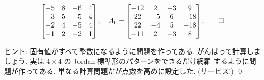 \documentclass[12pt,twoside]{jarticle}
\begin{document}
\begin{question}[各 $A_i$ ごとに10点]
{\begin{align*}
\begin{bmatrix}
      -5 &  8 & -6 &  4 \\
      -3 &  5 & -5 &  4 \\
      -2 &  4 & -5 &  4 \\
      -1 &  2 & -2 &  1 \\
    \end{bmatrix},
    \quad
    A_6 =
    \begin{bmatrix}
      -12 &   2 &  -3 &   9 \\
       22 &  -5 &   6 & -18 \\
       22 &  -4 &   5 & -18 \\
      -11 &   2 &  -3 &   8 \\
    \end{bmatrix}.
    \qed
  \end{align*}
  }%
\end{question}

\noindent
ヒント: 固有値がすべて整数になるように問題を作ってある. 
がんばって計算しましょう. 
実は $4\times 4$ の Jordan 標準形のパターンをできるだけ網羅
するように問題が作ってある.
単なる計算問題だが点数を高めに設定した. (サービス!)
\qed
\end{document}
